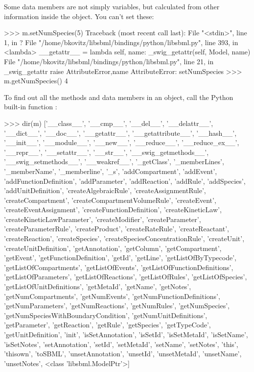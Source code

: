 \documentclass{sbmlmanual}
\begin{document}
Some data members are not simply variables, but calculated
from other information inside the  object.  You can't
set these:

\begin{shellVerbatim}
>>> m.setNumSpecies(5)
Traceback (most recent call last):
  File "<stdin>", line 1, in ?
  File "/home/bkovitz/libsbml/bindings/python/libsbml.py", line 393, in <lambda>
    __getattr__ = lambda self, name: _swig_getattr(self, Model, name)
  File "/home/bkovitz/libsbml/bindings/python/libsbml.py", line 21, in _swig_getattr
    raise AttributeError,name
AttributeError: setNumSpecies
>>> m.getNumSpecies()
4
\end{shellVerbatim}

To find out all the methods and data members in an 
object, call the Python built-in function :

\begin{shellVerbatim}
>>> dir(m)
['__class__', '__cmp__', '__del__', '__delattr__', '__dict__', '__doc__', '__getattr__', '__getattribute__', '__hash__', '__init__', '__module__', '__new__', '__reduce__', '__reduce_ex__', '__repr__', '__setattr__', '__str__', '__swig_getmethods__', '__swig_setmethods__', '__weakref__', '_getClass', '_memberLines', '_memberName', '_memberline', '_s', 'addCompartment', 'addEvent', 'addFunctionDefinition', 'addParameter', 'addReaction', 'addRule', 'addSpecies', 'addUnitDefinition', 'createAlgebraicRule', 'createAssignmentRule', 'createCompartment', 'createCompartmentVolumeRule', 'createEvent', 'createEventAssignment', 'createFunctionDefinition', 'createKineticLaw', 'createKineticLawParameter', 'createModifier', 'createParameter', 'createParameterRule', 'createProduct', 'createRateRule', 'createReactant', 'createReaction', 'createSpecies', 'createSpeciesConcentrationRule', 'createUnit', 'createUnitDefinition', 'getAnnotation', 'getColumn', 'getCompartment', 'getEvent', 'getFunctionDefinition', 'getId', 'getLine', 'getListOfByTypecode', 'getListOfCompartments', 'getListOfEvents', 'getListOfFunctionDefinitions', 'getListOfParameters', 'getListOfReactions', 'getListOfRules', 'getListOfSpecies', 'getListOfUnitDefinitions', 'getMetaId', 'getName', 'getNotes', 'getNumCompartments', 'getNumEvents', 'getNumFunctionDefinitions', 'getNumParameters', 'getNumReactions', 'getNumRules', 'getNumSpecies', 'getNumSpeciesWithBoundaryCondition', 'getNumUnitDefinitions', 'getParameter', 'getReaction', 'getRule', 'getSpecies', 'getTypeCode', 'getUnitDefinition', 'init', 'isSetAnnotation', 'isSetId', 'isSetMetaId', 'isSetName', 'isSetNotes', 'setAnnotation', 'setId', 'setMetaId', 'setName', 'setNotes', 'this', 'thisown', 'toSBML', 'unsetAnnotation', 'unsetId', 'unsetMetaId', 'unsetName', 'unsetNotes', <class 'libsbml.ModelPtr'>]
\end{shellVerbatim}
\end{document}
